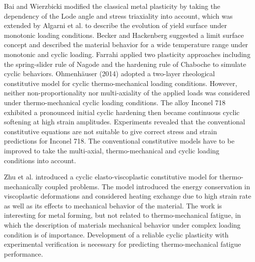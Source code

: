 Bai and Wierzbicki \cite{Bai20081071} modified the classical metal plasticity by taking the dependency of the Lode angle and stress triaxiality into account, which was extended by Algarni et al. \cite{Algarni2015140} to describe the evolution of yield surface under monotonic loading conditions. Becker and Hackenberg \cite{Becker2011596} suggested a limit surface concept and described the material behavior for a wide temperature range under monotonic and cyclic loading.
Farrahi \cite{Farrahi2014245} applied two plasticity approaches including the spring-slider rule of Nagode and the hardening rule of Chaboche to simulate cyclic behaviors.
Ohmenh\"{a}user (2014) \cite{Ohmenhauser2014631} adopted a two-layer rheological constitutive model for cyclic thermo-mechanical loading conditions.
However, neither non-proportionality nor multi-axiality of the applied loads was considered under thermo-mechanical cyclic loading conditions.
The alloy Inconel 718 exhibited a pronounced initial cyclic hardening then became continuous cyclic softening at high strain amplitudes. Experiments revealed that the conventional constitutive equations are not suitable to give correct stress and strain predictions for Inconel 718. The conventional constitutive models have to be improved to take the multi-axial, thermo-mechanical and cyclic loading conditions into account.

Zhu et al. \cite{ZHU2016} introduced a cyclic elasto-viscoplastic constitutive model for thermo-mechanically coupled problems. The model introduced the energy conservation in viscoplastic deformations and considered heating exchange due to high strain rate as well as its effects to mechanical behavior of the material. The work is interesting for metal forming, but not related to thermo-mechanical fatigue, in which the description of materials mechanical behavior under complex loading condition is of importance. 
Development of a reliable cyclic plasticity with experimental verification is necessary for predicting thermo-mechanical fatigue performance.


